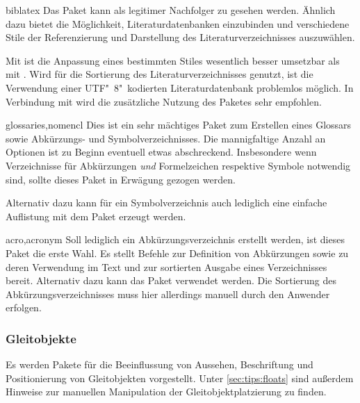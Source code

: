 \begin{packages}
\item[biblatex]
  Das Paket kann als legitimer Nachfolger zu  gesehen werden. 
  Ähnlich dazu bietet  die Möglichkeit, Literaturdatenbanken 
  einzubinden und verschiedene Stile der Referenzierung und Darstellung des 
  Literaturverzeichnisses auszuwählen. 
  
  Mit  ist die Anpassung eines bestimmten Stiles wesentlich 
  besser umsetzbar als mit . Wird  für die 
  Sortierung des Literaturverzeichnisses genutzt, ist die Verwendung einer 
  UTF"~8"~kodierten Literaturdatenbank problemlos möglich. In Verbindung mit 
   wird die zusätzliche Nutzung des Paketes 
   sehr empfohlen.
\item[glossaries,nomencl]
  Dies ist ein sehr mächtiges Paket zum Erstellen eines Glossars sowie 
  Abkürzungs- und Symbolverzeichnisses. Die mannigfaltige Anzahl an Optionen 
  ist zu Beginn eventuell etwas abschreckend. Insbesondere wenn Verzeichnisse 
  für Abkürzungen \emph{und} Formelzeichen respektive Symbole notwendig sind, 
  sollte dieses Paket in Erwägung gezogen werden.
  
  Alternativ dazu kann für ein Symbolverzeichnis auch lediglich eine einfache 
  Auflistung mit dem Paket  erzeugt werden.
\item[acro,acronym]
  Soll lediglich ein Abkürzungsverzeichnis erstellt werden, ist dieses Paket 
  die erste Wahl. Es stellt Befehle zur Definition von Abkürzungen sowie zu 
  deren Verwendung im Text und zur sortierten Ausgabe eines Verzeichnisses 
  bereit. Alternativ dazu kann das Paket  verwendet werden. 
  Die Sortierung des Abkürzungsverzeichnisses muss hier allerdings manuell 
  durch den Anwender erfolgen.
\end{packages}
%



\subsubsection{%
  Gleitobjekte%
}
%
Es werden Pakete für die Beeinflussung von Aussehen, Beschriftung und 
Positionierung von Gleitobjekten vorgestellt. Unter \autoref{sec:tips:floats} 
sind außerdem Hinweise zur manuellen Manipulation der Gleitobjektplatzierung zu 
finden.

